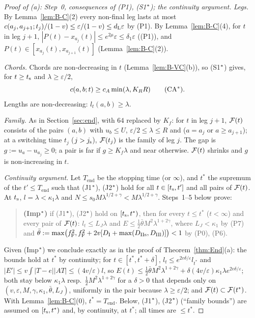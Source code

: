 \begin{proof}[Proof of \textup{(a)}: Step~0, consequences of \textup{(P1)}, \textup{(S1$^{*}$)}; the continuity argument]
\emph{Legs.} By Lemma~\ref{lem:B-C}(2) every non-final leg lasts at most $c(a_j,a_{j+1};t_j)/(1-v)\le\varepsilon/(1-v)\le d_{\mathrm L}\varepsilon$
by \textup{(P1)}. By Lemma~\ref{lem:B-C}(4), for $t$ in leg $j+1$, $|P(t)-x_{a_j}(t)|\le e^{2\mu}\varepsilon\le\delta_1\varepsilon$
(\textup{(P1)}), and $P(t)\in[x_{a_j}(t),x_{a_{j+1}}(t)]$ (Lemma~\ref{lem:B-C}(2)).

\emph{Chords.} Chords are non-decreasing in $t$ (Lemma~\ref{lem:B-VC}(b)), so (S1$^{*}$) gives, for $t\ge t_{\mathrm s}$ and $\lambda\ge\varepsilon/2$,
\begin{equation}\label{eq:Estar-CA}
c(a,b;t)\ge c_A\min(\lambda,K_RR)\qquad\text{(CA$^{*}$)}.
\end{equation}
Lengths are non-decreasing: $l_t(a,b)\ge\lambda$.

\emph{Family.} As in Section~\ref{sec:end}, with $64$ replaced by $K_f$: for $t$ in leg $j+1$, $\mathcal F(t)$ consists of the pairs $(a,b)$
with $u_b\le U$, $\varepsilon/2\le\lambda\le R$ and ($a=a_j$ or $a\ge a_{j+1}$); at a switching time $t_j$ ($j>j_{\mathrm s}$), $\mathcal F(t_j)$ is
the family of leg $j$. The gap is $g:=u_a-u_{a_j}\ge0$; a pair is far if $g\ge K_f\lambda$ and near otherwise. $\mathcal F(t)$ shrinks and
$g$ is non-increasing in $t$.

\emph{Continuity argument.} Let $T_{\mathrm{end}}$ be the stopping time (or $\infty$), and $t^*$ the supremum of the
$t'\le T_{\mathrm{end}}$ such that (J1$^{*}$), (J2$^{*}$) hold for all $t\in[t_{\mathrm s},t']$ and all pairs of $\mathcal F(t)$. At $t_{\mathrm s}$,
$l=\lambda<\kappa_1\lambda$ and $N\le s_0M\lambda^{1/2+\gamma}<M\lambda^{1/2+\gamma}$. Steps~1--5 below prove:
\begin{quote}
\textbf{(Imp$^{*}$)} if (J1$^{*}$), (J2$^{*}$) hold on $[t_{\mathrm s},t^*)$, then for every $t\le t^*$ ($t<\infty$) and every pair of
$\mathcal F(t)$: $l_t\le L_J\lambda$ and $E\le\frac12\bar\theta M^2\lambda^{1+2\gamma}$, where $L_J<\kappa_1$ by \textup{(P7)} and
$\bar\theta:=\max\bigl(f_{\mathrm F}^2,f_{\mathrm F}^2+2v[D_{\mathrm I}+\max(D_{\mathrm{IIs}},D_{\mathrm{IIl}})]\bigr)<1$ by \textup{(P0)}, \textup{(P6)}.
\end{quote}
Given (Imp$^{*}$) we conclude exactly as in the proof of Theorem~\ref{thm:End}(a): the bounds hold at $t^*$ by continuity; for
$t\in[t^*,t^*+\delta]$, $l_t\le e^{2v\delta/\varepsilon}l_{t^*}$ and $|E'|\le v\int|T-e||AT|\le(4v/\varepsilon)l$, so
$E(t)\le\frac12\bar\theta M^2\lambda^{1+2\gamma}+\delta(4v/\varepsilon)\kappa_1\lambda e^{2v\delta/\varepsilon}$; both stay below
$\kappa_1\lambda$ resp.\ $\frac12M^2\lambda^{1+2\gamma}$ for a $\delta>0$ that depends only on
$(v,\varepsilon,M,\gamma,\kappa_1,\bar\theta,L_J)$, uniformly in the pair because $\lambda\ge\varepsilon/2$; and
$\mathcal F(t)\subset\mathcal F(t^*)$. With Lemma~\ref{lem:B-C}(0), $t^*=T_{\mathrm{end}}$. Below, (J1$^{*}$), (J2$^{*}$) (``family bounds'') are
assumed on $[t_{\mathrm s},t^*)$ and, by continuity, at $t^*$; all times are $\le t^*$.
\end{proof}

